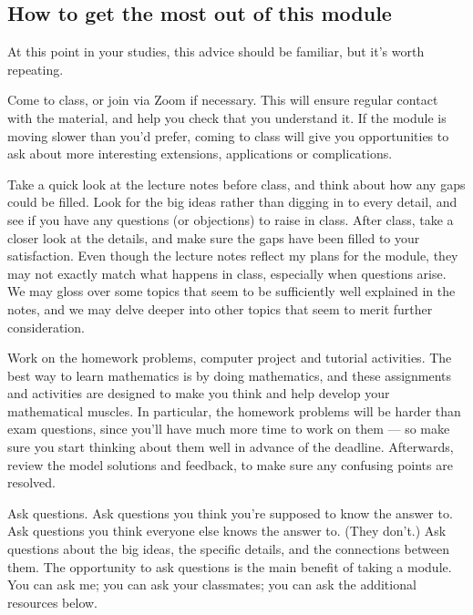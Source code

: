\subsection*{How to get the most out of this module}
At this point in your studies, this advice should be familiar, but it's worth repeating.

Come to class, or join via Zoom if necessary.
This will ensure regular contact with the material, and help you check that you understand it.
If the module is moving slower than you'd prefer, coming to class will give you opportunities to ask about more interesting extensions, applications or complications.

Take a quick look at the lecture notes before class, and think about how any gaps could be filled.
Look for the big ideas rather than digging in to every detail, and see if you have any questions (or objections) to raise in class.
After class, take a closer look at the details, and make sure the gaps have been filled to your satisfaction.
Even though the lecture notes reflect my plans for the module, they may not exactly match what happens in class, especially when questions arise.
We may gloss over some topics that seem to be sufficiently well explained in the notes, and we may delve deeper into other topics that seem to merit further consideration.

Work on the homework problems, computer project and tutorial activities.
The best way to learn mathematics is by doing mathematics, and these assignments and activities are designed to make you think and help develop your mathematical muscles.
In particular, the homework problems will be harder than exam questions, since you'll have much more time to work on them --- so make sure you start thinking about them well in advance of the deadline.
Afterwards, review the model solutions and feedback, to make sure any confusing points are resolved.

Ask questions.
Ask questions you think you're supposed to know the answer to.
Ask questions you think everyone else knows the answer to.
(They don't.)
Ask questions about the big ideas, the specific details, and the connections between them.
The opportunity to ask questions is the main benefit of taking a module.
You can ask me; you can ask your classmates; you can ask the additional resources below.


